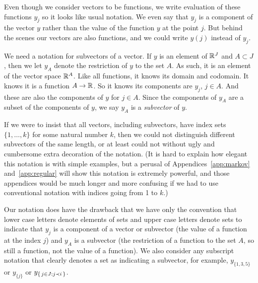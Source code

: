 Even though we consider vectors to be functions, we write evaluation
of these functions $y_j$ so it looks like usual notation.  We even say
that $y_j$ is a component of the vector $y$ rather than the value of
the function $y$ at the point $j$.  But behind the scenes our vectors
are also functions, and we could write $y(j)$ instead of $y_j$.

We need a notation for subvectors of a vector.  If $y$ is an element
of $\mathbb{R}^J$ and $A \subset J$, then we let $y_A$ denote the restriction
of $y$ to the set $A$.
As such, it is an element of the vector space $\mathbb{R}^A$.
Like all functions, it knows its domain and codomain.
It knows it is a function $A \to \mathbb{R}$.
So it knows its components are $y_j$, $j \in A$.
And these are also the components of $y$ for $j \in A$.
Since the components of $y_A$ are a subset of the components of $y$,
we say $y_A$ is a \emph{subvector} of $y$.

If we were to insist that all vectors, including subvectors, have
index sets $\{1, \ldots, k\}$ for some natural number $k$, then we could
not distinguish different subvectors of the same length, or at least could
not without ugly and cumbersome extra decoration of the notation.
(It is hard to explain how elegant this notation is with simple examples,
but a perusal of Appendices~\ref{app:markov} and~\ref{app:regular}
will show this notation is
extremely powerful, and those appendices would be much longer and more confusing
if we had to use conventional notation with indices going from 1 to $k$.)

Our notation does have the drawback that we have only the convention
that lower case letters denote elements of sets and upper case letters
denote sets to indicate that $y_j$ is a component of a vector or subvector
(the value of a function at the index $j$) and $y_A$ is a subvector
(the restriction of a function to the set $A$, so still a function,
not the value of a function).
We also consider any subscript notation that clearly denotes a set
as indicating a subvector, for example, $y_{\{1, 3, 5\}}$ or $y_{\{j\}}$ or
$y_{\{\,  j \in J : j \prec i  \,\}}$.

